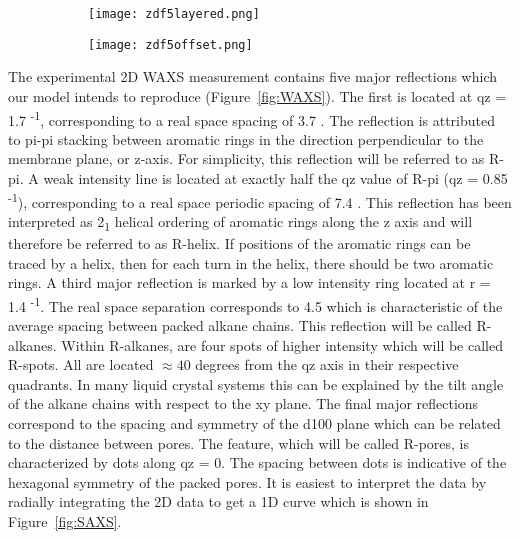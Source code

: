 \begin{figure}
	\centering
	\begin{subfigure}{0.45\textwidth}
		\centering
		\texttt{[image: zdf5layered.png]}
		\caption{}\label{fig:zdf_layered}
	\end{subfigure}
	\begin{subfigure}{0.45\textwidth}
		\centering
		\texttt{[image: zdf5offset.png]}
		\caption{}\label{fig:zdf_offset}
	\end{subfigure}
\end{figure}

The experimental 2D WAXS measurement contains five major reflections which
our model intends to reproduce (Figure~\ref{fig:WAXS}). The first is located
at qz = 1.7 \angstrom \textsuperscript{-1}, corresponding to a real space 
spacing of 3.7 \angstrom. The reflection is attributed to pi-pi stacking
between aromatic rings in the direction perpendicular to the membrane plane, or z-axis. 
For simplicity, this reflection will be referred to as R-pi. A weak intensity
line is located at exactly half the qz value of R-pi (qz = 0.85 \angstrom \textsuperscript{-1}), corresponding to a 
real space periodic spacing of 7.4 \angstrom. This reflection has been 
interpreted  as 2\textsubscript{1} helical ordering of aromatic rings along the
z axis and will therefore be referred to as R-helix. If positions of the 
aromatic rings can be traced by a helix, then for each turn in the helix, 
there should be two aromatic rings. A third major reflection is marked by 
a low intensity ring located at r = 1.4 \angstrom \textsuperscript{-1}. The
real space separation corresponds to 4.5 \angstrom which is characteristic
of the average spacing between packed alkane chains. This reflection will be
called R-alkanes. Within R-alkanes, are four spots of higher intensity which 
will be called R-spots. All are located $\approx 40$ degrees from the qz axis
in their respective quadrants. In many liquid crystal systems this can be
explained by the tilt angle of the alkane chains with respect to the xy plane. 
The final major reflections correspond to the spacing and symmetry of the d100 
plane which can be related to the distance between pores. The feature, which 
will be called R-pores, is characterized by dots along qz = 0. The spacing
between dots is indicative of the hexagonal symmetry of the packed pores. It
is easiest to interpret the data by radially integrating the 2D data to get 
a 1D curve which is shown in Figure~\ref{fig:SAXS}.

